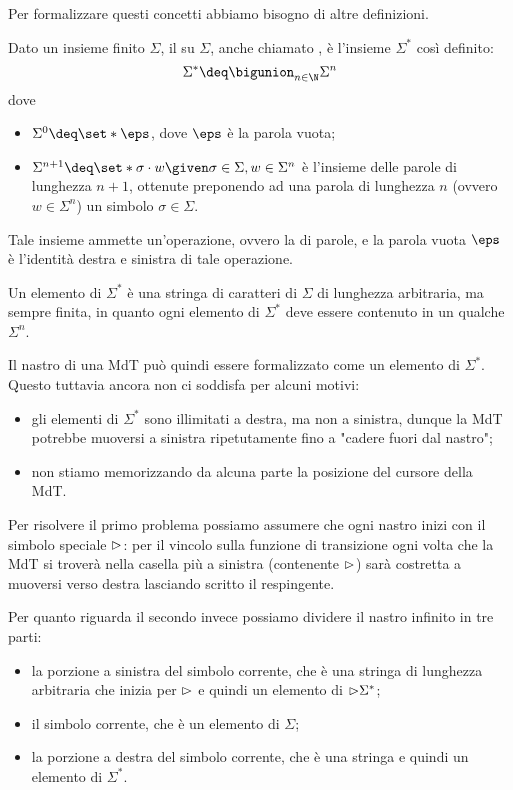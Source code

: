 Per formalizzare questi concetti abbiamo bisogno di altre definizioni.

\begin{definition}
    Dato un insieme finito $\Sigma$, il  su $\Sigma$, anche chiamato , è l'insieme $\Sigma^\ast$ così definito: \[
        \Sigma^\ast \deq \bigunion_{n \in \N} \Sigma^n
    \] dove \begin{itemize}
        \item $\Sigma^0 \deq \set*{\eps}$, dove $\eps$ è la parola vuota;
        \item $\Sigma^{n+1} \deq \set*{\sigma \cdot w \given \sigma \in \Sigma, w \in \Sigma^n}$ è l'insieme delle parole di lunghezza $n+1$, ottenute preponendo ad una parola di lunghezza $n$ (ovvero $w \in \Sigma^n$) un simbolo $\sigma \in \Sigma$. 
    \end{itemize}
    Tale insieme ammette un'operazione, ovvero la  di parole, e la parola vuota $\eps$ è l'identità destra e sinistra di tale operazione. 
\end{definition}

\begin{remark}
    Un elemento di $\Sigma^\ast$ è una stringa di caratteri di $\Sigma$ di lunghezza arbitraria, ma sempre finita, in quanto ogni elemento di $\Sigma^\ast$ deve essere contenuto in un qualche $\Sigma^n$.
\end{remark}

Il nastro di una MdT può quindi essere formalizzato come un elemento di $\Sigma^\ast$. Questo tuttavia ancora non ci soddisfa per alcuni motivi:
\begin{itemize}
    \item gli elementi di $\Sigma^\ast$ sono illimitati a destra, ma non a sinistra, dunque la MdT potrebbe muoversi a sinistra ripetutamente fino a "cadere fuori dal nastro";
    \item non stiamo memorizzando da alcuna parte la posizione del cursore della MdT.
\end{itemize}

Per risolvere il primo problema possiamo assumere che ogni nastro inizi con il simbolo speciale ${\vartriangleright}$:
per il vincolo sulla funzione di transizione ogni volta che la MdT si troverà nella casella più a sinistra (contenente ${\vartriangleright}$) sarà costretta a muoversi verso destra lasciando scritto il respingente.

Per quanto riguarda il secondo invece possiamo dividere il nastro infinito in tre parti: \begin{itemize}
    \item la porzione a sinistra del simbolo corrente, che è una stringa di lunghezza arbitraria che inizia per ${\vartriangleright}$ e quindi un elemento di ${\vartriangleright}\Sigma^\ast$;
    \item il simbolo corrente, che è un elemento di $\Sigma$;
    \item la porzione a destra del simbolo corrente, che è una stringa e quindi un elemento di $\Sigma^\ast$.   
\end{itemize}

